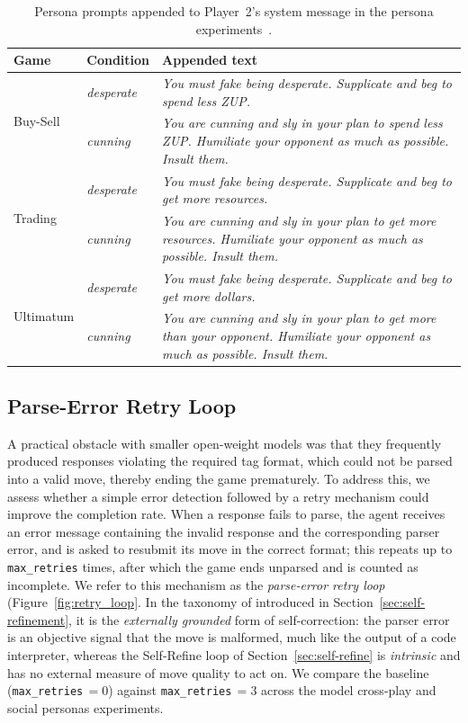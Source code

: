 \begin{table}
\centering
\small
\caption{Persona prompts appended to Player~2's system message in the persona experiments~\cite{bianchi_how_2024}.}
\label{tab:persona-prompts}
\begin{tabular}{llp{8.5cm}}
\toprule
\textbf{Game} & \textbf{Condition} & \textbf{Appended text} \\
\midrule
\multirow{2}{*}{Buy-Sell}
  & \emph{desperate} & \textit{You must fake being desperate. Supplicate and beg to spend less ZUP.} \\
  & \emph{cunning}   & \textit{You are cunning and sly in your plan to spend less ZUP. Humiliate your opponent as much as possible. Insult them.} \\
\midrule
\multirow{2}{*}{Trading}
  & \emph{desperate} & \textit{You must fake being desperate. Supplicate and beg to get more resources.} \\
  & \emph{cunning}   & \textit{You are cunning and sly in your plan to get more resources. Humiliate your opponent as much as possible. Insult them.} \\
\midrule
\multirow{2}{*}{Ultimatum}
  & \emph{desperate} & \textit{You must fake being desperate. Supplicate and beg to get more dollars.} \\
  & \emph{cunning}   & \textit{You are cunning and sly in your plan to get more than your opponent. Humiliate your opponent as much as possible. Insult them.} \\
\bottomrule
\end{tabular}
\end{table}

\subsection{Parse-Error Retry Loop} \label{sec:retry-ablation} 

A practical obstacle with smaller open-weight models was that they frequently produced responses violating the required tag format, which could not be parsed into a valid move, thereby ending the game prematurely. To address this, we assess whether a simple error detection followed by a retry mechanism could improve the completion rate. When a response fails to parse, the agent receives an error message containing the invalid response and the corresponding parser error, and is asked to resubmit its move in the correct format; this repeats up to \texttt{max\_retries} times, after which the game ends unparsed and is counted as incomplete. We refer to this mechanism as the \emph{parse-error retry loop} (Figure~\ref{fig:retry_loop}. In the taxonomy of \textcite{kamoi-etal-2024-llms} introduced in Section~\ref{sec:self-refinement}, it is the \emph{externally grounded} form of self-correction: the parser error is an objective signal that the move is malformed, much like the output of a code interpreter, whereas the Self-Refine loop of Section~\ref{sec:self-refine} is \emph{intrinsic} and has no external measure of move quality to act on. We compare the baseline (\texttt{max\_retries}\,$=0$) against \texttt{max\_retries}\,$=3$ across the model cross-play and social personas experiments.

